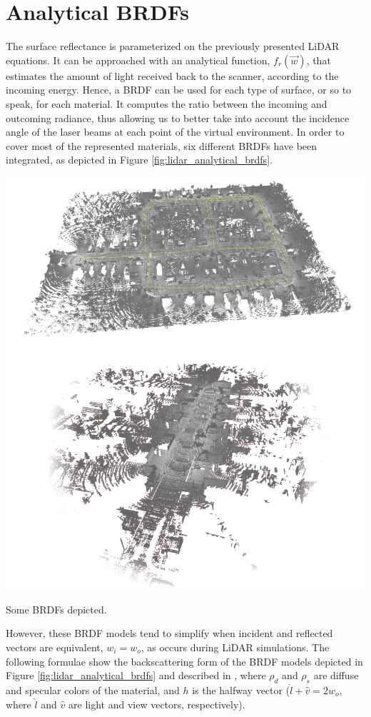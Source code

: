 \section{Analytical BRDFs}

The surface reflectance is parameterized on the previously presented LiDAR equations. It can be approached with an analytical function, $f_{r}(\vec{w})$, that estimates the amount of light received back to the scanner, according to the incoming energy. Hence, a BRDF can be used for each type of surface, or so to speak, for each material. It computes the ratio between the incoming and outcoming radiance, thus allowing us to better take into account the incidence angle of the laser beams at each point of the virtual environment. In order to cover most of the represented materials, six different BRDFs have been integrated, as depicted in Figure \ref{fig:lidar_analytical_brdfs}.

\begin{marginfigure}[3cm]
    \centering
    \includegraphics[width=\linewidth]{figs/lidar_intensity/analytical_brdf_intensity_result.png}
    \caption{Some BRDFs depicted. }
	\label{fig:lidar_analytical_brdfs_intensity_result}
\end{marginfigure}
However, these BRDF models tend to simplify when incident and reflected vectors are equivalent, $w_{i} = w_{o}$, as occurs during LiDAR simulations. The following formulae show the backscattering form of the BRDF models depicted in Figure \ref{fig:lidar_analytical_brdfs} and described in \cite{montes_soldado_overview_2012, guarnera_brdf_2016}, where $\rho_{d}$ and $\rho_{s}$ are diffuse and specular colors of the material, and $h$ is the halfway vector ($\hat{l} + \hat{v} = 2w_{o}$, where $\hat{l}$ and $\hat{v}$ are light and view vectors, respectively).

